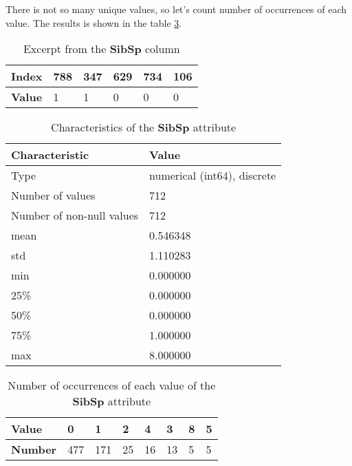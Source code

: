 There is not so many unique values, so let's count number of occurrences 
of each value. The results is shown in the table \ref{table:sibsp_value_counts}.

\begin{table}[!hp]
    \centering
    \caption{Excerpt from the \textbf{SibSp} column}
    \begin{tabular}{|l|l|l|l|l|l|}
        \hline
        \textbf{Index} & 788 & 347 & 629 & 734 & 106 \\ \hline
        \textbf{Value} & 1   & 1   & 0   & 0   & 0   \\ \hline
    \end{tabular}
    \label{table:sibsp_head}
\end{table}

\begin{table}[!hp]
    \centering
    \caption{Characteristics of the \textbf{SibSp} attribute}
    \begin{tabular}{|l|l|}
        \hline
        \textbf{Characteristic}   & \textbf{Value}              \\ \hline
        Type                      & numerical (int64), discrete \\ \hline
        Number of values          & 712                         \\ \hline
        Number of non-null values & 712                         \\ \hline
        mean                      & 0.546348                    \\ \hline
        std                       & 1.110283                    \\ \hline
        min                       & 0.000000                    \\ \hline
        25\%                      & 0.000000                    \\ \hline
        50\%                      & 0.000000                    \\ \hline
        75\%                      & 1.000000                    \\ \hline
        max                       & 8.000000                    \\ \hline
    \end{tabular}
    \label{table:sibsp_characteristics}
\end{table}

\begin{table}[!hp]
    \centering
    \caption{Number of occurrences of each value of the \textbf{SibSp}
             attribute}
    \begin{tabular}{|l|l|l|l|l|l|l|l|}
        \hline
        \textbf{Value}  & 0   & 1   & 2  & 4  & 3  & 8 & 5 \\ \hline
        \textbf{Number} & 477 & 171 & 25 & 16 & 13 & 5 & 5 \\ \hline
    \end{tabular}
    \label{table:sibsp_value_counts}
\end{table}


